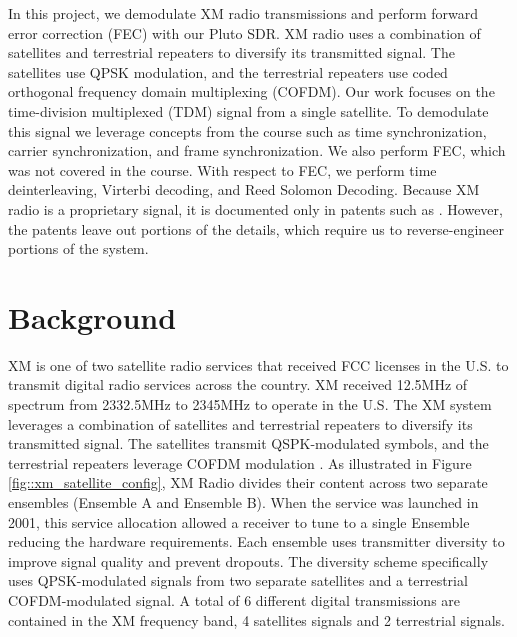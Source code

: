 \documentclass[conference,onecolumn]{IEEEtran}
\begin{document}
In this project, we demodulate XM radio transmissions and perform forward error correction (FEC) with our Pluto SDR. XM radio uses a combination of satellites and terrestrial repeaters to diversify its transmitted signal. The satellites use QPSK modulation, and the terrestrial repeaters use coded orthogonal frequency domain multiplexing (COFDM). Our work focuses on the time-division multiplexed (TDM) signal from a single satellite. To demodulate this signal we leverage concepts from the course such as time synchronization, carrier synchronization, and frame synchronization. We also perform FEC, which was not covered in the course. With respect to FEC, we perform time deinterleaving, Virterbi decoding, and Reed Solomon Decoding. Because XM radio is a proprietary signal, it is documented only in patents such as \cite{a2008_us8260192b2, marko_2012_us8667344b2}. However, the patents leave out portions of the details, which require us to reverse-engineer portions of the system.

\section{Background}


XM is one of two satellite radio services that received FCC licenses in the U.S. to transmit digital radio services across the country.  XM received 12.5MHz of spectrum from 2332.5MHz to 2345MHz to operate in the U.S.  The XM system leverages a combination of satellites and terrestrial repeaters to diversify its transmitted signal. The satellites transmit QSPK-modulated symbols, and the terrestrial repeaters leverage COFDM modulation \cite{5586866}.  As illustrated in Figure \ref{fig::xm_satellite_config}, XM Radio divides their content across two separate ensembles (Ensemble A and Ensemble B).  When the service was launched in 2001, this service allocation allowed a receiver to tune to a single Ensemble reducing the hardware requirements.  Each ensemble uses transmitter diversity to improve signal quality and prevent dropouts. The diversity scheme specifically uses QPSK-modulated signals from two separate satellites and a terrestrial COFDM-modulated signal.  A total of 6 different digital transmissions are contained in the XM frequency band, 4 satellites signals and 2 terrestrial signals.
\end{document}
